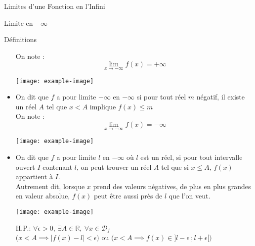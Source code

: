 \documentclass{cours}
\begin{document}
\begin{Gpartie}{Limites d'une Fonction en l'Infini}
\begin{Spartie}{Limite en $-\infty$}
\begin{SSpartie}{Définitions}
\begin{itemize}
                    On note : \[\lim\limits_{x\to-\infty}f(x)=+\infty\]
                    \begin{center}
                            \texttt{[image: example-image]}
                        \parbox{\linewidth}{}
                    \end{center}
                    \vspace*{2ex}
                    \item   On dit que $f$ a pour limite $-\infty$ en $-\infty$ si pour tout réel $m$ négatif, il existe un réel $A$ tel que $x<A$ implique $f(x)\leq m$ \\ On note : \[\lim\limits_{x\to-\infty}f(x)=-\infty\]
                    \begin{center}
                            \texttt{[image: example-image]}
                        \parbox{\linewidth}{}
                    \end{center}
                    \item   On dit que $f$ a pour limite $l$ en $-\infty$ où $l$ est un réel, si pour tout intervalle ouvert $I$ contenant $l$, on peut trouver un réel $A$ tel que si $x\leq A$, $f(x)$ appartient à $I$. \\ Autrement dit, lorsque $x$ prend des valeurs négatives, de plus en plus grandes en valeur absolue, $f(x)$ peut être aussi près de $l$ que l'on veut.
                    \begin{center}
                            \texttt{[image: example-image]}
                        \parbox{\linewidth}{}
                    \end{center}
                    \vspace*{2ex}
                    H.P.: $\forall\epsilon >0,~\exists A\in\mathbb{R},~\forall x\in\mathcal{D}_f$ \\ \phantom{H.P.: }$\bigg(x<A\implies\left\lvert f(x)-l\right\rvert <\epsilon\bigg)$ ou $\bigg(x<A\implies f(x)\in\big]l-\epsilon~;l+\epsilon\big[\bigg)$

\end{itemize}
\end{SSpartie}
\end{Spartie}
\end{Gpartie}
\end{document}
